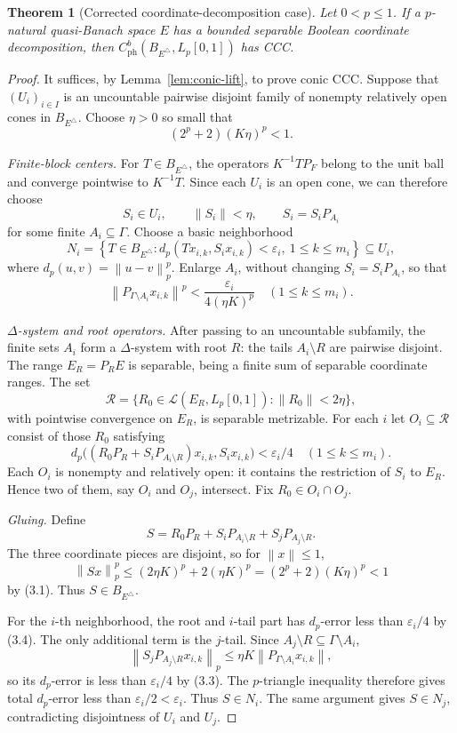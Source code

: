 \documentclass[11pt]{article}
\newtheorem{theorem}{Theorem}[section]
\theoremstyle{definition}
\newcommand{\Lp}{L_p[0,1]}
\newcommand{\cph}{C_{\mathrm{ph}}^b}
\newcommand{\calL}{\mathcal L}
\newcommand{\calR}{\mathcal R}
\newcommand{\norm}[1]{\left\lVert #1\right\rVert}
\begin{document}
\begin{theorem}[Corrected coordinate-decomposition case]
\label{thm:boolean}
Let $0<p\leq1$.  If a $p$-natural quasi-Banach space $E$ has a bounded
separable Boolean coordinate decomposition, then
$\cph(B_{E^\triangle},\Lp)$ has CCC.
\end{theorem}

\begin{proof}
It suffices, by Lemma~\ref{lem:conic-lift}, to prove conic CCC.  Suppose that
$(U_i)_{i\in I}$ is an uncountable pairwise disjoint family of nonempty relatively
open cones in $B_{E^\triangle}$.  Choose $\eta>0$ so small that
\[
 (2^p+2)(K\eta)^p<1.                                    \tag{3.1}
\]

\emph{Finite-block centers.}
For $T\in B_{E^\triangle}$, the operators $K^{-1}TP_F$ belong to the unit ball
and converge pointwise to $K^{-1}T$.  Since each $U_i$ is an open cone, we can
therefore choose
\[
 S_i\in U_i,\qquad \norm{S_i}<\eta,\qquad S_i=S_iP_{A_i}
\]
for some finite $A_i\subseteq\Gamma$.
Choose a basic neighborhood
\[
 N_i=\left\{T\in B_{E^\triangle}:
 d_p(Tx_{i,k},S_ix_{i,k})<\varepsilon_i,
 \ 1\leq k\leq m_i\right\}\subseteq U_i,               \tag{3.2}
\]
where $d_p(u,v)=\norm{u-v}_p^p$.
Enlarge $A_i$, without changing $S_i=S_iP_{A_i}$, so that
\[
 \norm{P_{\Gamma\setminus A_i}x_{i,k}}^p
 <\frac{\varepsilon_i}{4(\eta K)^p}
 \quad(1\leq k\leq m_i).                                \tag{3.3}
\]

\emph{$\Delta$-system and root operators.}
After passing to an uncountable subfamily, the finite sets $A_i$ form a
$\Delta$-system with root $R$: the tails $A_i\setminus R$ are pairwise disjoint.
The range $E_R=P_RE$ is separable, being a finite sum of separable coordinate
ranges.  The set
\[
 \calR=\{R_0\in\calL(E_R,\Lp):\norm{R_0}<2\eta\},
\]
with pointwise convergence on $E_R$, is separable metrizable.
For each $i$ let $O_i\subseteq\calR$ consist of those $R_0$ satisfying
\[
 d_p\bigl((R_0P_R+S_iP_{A_i\setminus R})x_{i,k},
          S_ix_{i,k}\bigr)<\varepsilon_i/4
 \quad(1\leq k\leq m_i).                                \tag{3.4}
\]
Each $O_i$ is nonempty and relatively open: it contains the restriction of
$S_i$ to $E_R$.  Hence two of them, say $O_i$ and $O_j$, intersect.  Fix
$R_0\in O_i\cap O_j$.

\emph{Gluing.}
Define
\[
 S=R_0P_R+S_iP_{A_i\setminus R}+S_jP_{A_j\setminus R}.
\]
The three coordinate pieces are disjoint, so for $\norm{x}\leq1$,
\[
 \norm{Sx}_p^p
 \leq (2\eta K)^p+2(\eta K)^p
 =(2^p+2)(K\eta)^p<1
\]
by (3.1).  Thus $S\in B_{E^\triangle}$.

For the $i$-th neighborhood, the root and $i$-tail part has $d_p$-error less
than $\varepsilon_i/4$ by (3.4).  The only additional term is the $j$-tail.
Since $A_j\setminus R\subseteq\Gamma\setminus A_i$,
\[
 \norm{S_jP_{A_j\setminus R}x_{i,k}}_p
 \leq \eta K\norm{P_{\Gamma\setminus A_i}x_{i,k}},
\]
so its $d_p$-error is less than $\varepsilon_i/4$ by (3.3).  The
$p$-triangle inequality therefore gives total $d_p$-error less than
$\varepsilon_i/2<\varepsilon_i$.  Thus $S\in N_i$.  The same argument gives
$S\in N_j$, contradicting disjointness of $U_i$ and $U_j$.
\end{proof}
\end{document}
